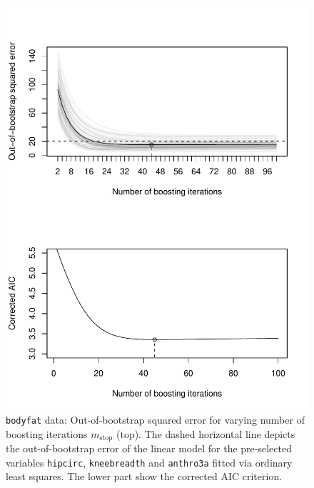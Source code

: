 \documentclass{article}
\newcommand{\Robject}[1]{\texttt{#1}}
\begin{document}
\begin{figure}
\begin{center}
\includegraphics{figures/bodyfat_glmboost-bodyfat-oob-plot.pdf}
\caption{\Robject{bodyfat} data: Out-of-bootstrap squared error for varying number of 
         boosting iterations $m_\text{stop}$ (top). The dashed horizontal line
         depicts the out-of-bootstrap error of the linear model 
         for the pre-selected variables \Robject{hipcirc}, \Robject{kneebreadth} 
         and \Robject{anthro3a} fitted via ordinary least squares. 
         The lower part show the corrected AIC criterion.
         \label{bodyfat-oob-plot}}
\end{center}
\end{figure}
\end{document}
